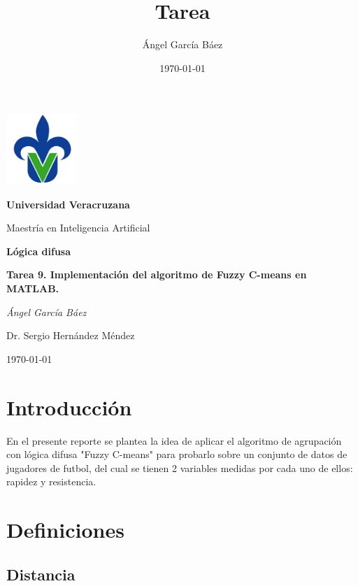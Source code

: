 \documentclass[11pt, letterpaper]{article}
\title{\bfseries Tarea}
\author{Ángel García Báez}
\date{\today}
\begin{document}
	
	\begin{titlepage}
		\centering
		\includegraphics[width=0.2\textwidth]{logo.png}\par
		\vspace{1cm}
		{\LARGE \bfseries Universidad Veracruzana \par}
		\vspace{1cm}
		{\Large Maestría en Inteligencia Artificial\par}
		\vspace{3cm}
		{\LARGE \bfseries Lógica difusa \par}
		\vspace{1cm}
		{\Large \bfseries Tarea 9. Implementación del algoritmo de Fuzzy C-means en MATLAB. \par}
		\vfill
		{\Large \textit{Ángel García Báez}\par}
		\vfill
		{\Large Dr. Sergio Hernández Méndez \par}
		\vfill
		{\Large \today \par}
	\end{titlepage}
	
	\newpage
	\tableofcontents
	\newpage
	

\section{Introducción}

En el presente reporte se plantea la idea de aplicar el  algoritmo de agrupación con lógica difusa "Fuzzy C-means" para probarlo sobre un conjunto de datos de jugadores de futbol, del cual se tienen 2 variables medidas por cada uno de ellos: rapidez y resistencia.




\newpage

\section{Definiciones}

\subsection{Distancia}
\end{document}
